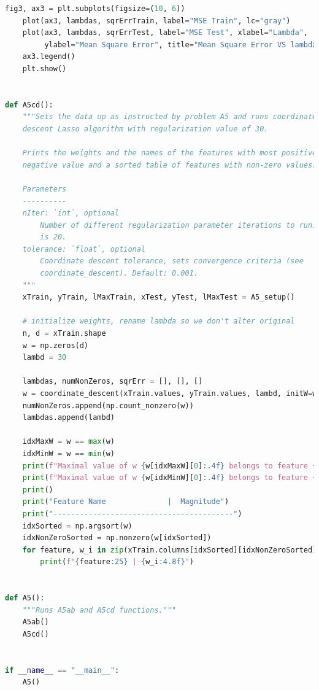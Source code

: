 \documentclass{article}
\newcommand{\1}{\mathbf{1}}
\begin{document}
\begin{enumerate}
\begin{lstlisting}[language=Python]
    fig3, ax3 = plt.subplots(figsize=(10, 6))
    plot(ax3, lambdas, sqrErrTrain, label="MSE Train", lc="gray")
    plot(ax3, lambdas, sqrErrTest, label="MSE Test", xlabel="Lambda",
         ylabel="Mean Square Error", title="Mean Square Error VS lambda.")
    ax3.legend()
    plt.show()


def A5cd():
    """Sets the data up as instructed by problem A5 and runs coordinate
    descent Lasso algorithm with regularization value of 30. 

    Prints the weights and the names of the features with most positive, most
    negative value and a sorted table of features with non-zero values.

    Parameters
    ----------
    nIter: `int`, optional
        Number of different regularization parameter iterations to run. Default
        is 20.
    tolerance: `float`, optional
        Coordinate descent tolerance, sets convergence criteria (see
        coordinate_descent). Default: 0.001.
    """
    xTrain, yTrain, lMaxTrain, xTest, yTest, lMaxTest = A5_setup()

    # initialize weights, rename lambda so we don't alter original
    n, d = xTrain.shape
    w = np.zeros(d)
    lambd = 30

    lambdas, numNonZeros, sqrErr = [], [], []
    w = coordinate_descent(xTrain.values, yTrain.values, lambd, initW=w, convergeFast=False)
    numNonZeros.append(np.count_nonzero(w))
    lambdas.append(lambd)

    idxMaxW = w == max(w)
    idxMinW = w == min(w)
    print(f"Maximal value of w {w[idxMaxW][0]:.4f} belongs to feature {xTrain.columns[idxMaxW][0]}")
    print(f"Maximal value of w {w[idxMinW][0]:.4f} belongs to feature {xTrain.columns[idxMinW][0]}")
    print()
    print("Feature Name              |  Magnitude")
    print("-----------------------------------------")
    idxSorted = np.argsort(w)
    idxNonZeroSorted = np.nonzero(w[idxSorted])
    for feature, w_i in zip(xTrain.columns[idxSorted][idxNonZeroSorted], w[idxSorted][idxNonZeroSorted]):
        print(f"{feature:25} | {w_i:4.8f}")


def A5():
    """Runs A5ab and A5cd functions."""
    A5ab()
    A5cd()


if __name__ == "__main__":
    A5()
\end{lstlisting}
\end{enumerate}



\newpage
\end{document}
